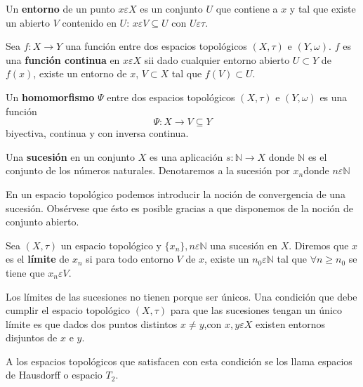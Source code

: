 \begin{definicion}
Un {\bf entorno} de un punto $x \varepsilon X$ es un conjunto $U$ que contiene a $x$ y tal que existe un abierto $V$ contenido en $U$: $x \varepsilon V \subseteq U$ con $U \varepsilon \tau$.
\end{definicion}

\begin{definicion}
Sea $f: X \rightarrow Y$ una funci\'on entre dos espacios topol\'ogicos $(X, \tau)$ e $(Y,\omega)$. $f$ es una {\bf funci\'on continua} en $x \varepsilon X$ sii dado cualquier entorno abierto $U \subset Y$ de $f(x)$, existe un entorno de $x$, $V \subset X$ tal que $f(V) \subset U$.
\end{definicion}

\begin{definicion}
Un {\bf homomorfismo} $\Psi$ entre dos espacios topol\'ogicos $(X,\tau)$ e $(Y,\omega)$ es una funci\'on
\[
\Psi: X \rightarrow V \subseteq Y
\]
biyectiva, continua y con inversa continua.
\end{definicion}

\begin{definicion}
Una {\bf sucesi\'on} en un conjunto $X$ es una aplicaci\'on $s: \mathbb{N} \rightarrow X$ donde $\mathbb{N}$ es el conjunto de los n\'umeros naturales. Denotaremos a la sucesi\'on por ${x_n} \text{donde  } n \varepsilon \mathbb{N}$
\end{definicion}

En un espacio topol\'ogico podemos introducir la noci\'on de convergencia de una sucesi\'on. Obs\'ervese que \'esto es posible gracias a que disponemos de la noci\'on de conjunto abierto.

\begin{definicion}
Sea $(X, \tau)$ un espacio topol\'ogico y $\{x_n\}, n \varepsilon \mathbb{N}$ una sucesi\'on en $X$. Diremos que $x$ es el {\bf l\'imite} de $x_n $ si para todo entorno $V$ de $x$, existe un $n_0 \varepsilon \mathbb{N}$ tal que $\forall n \geq n_0$ se tiene que $x_n \varepsilon V$.
\end{definicion}

Los l\'imites de las sucesiones no tienen porque ser \'unicos. Una condici\'on que debe cumplir el espacio topol\'ogico $(X,\tau)$ para que las sucesiones tengan un \'unico l\'imite es que dados dos puntos distintos $x \neq y$,con $ x,y \varepsilon X$ existen entornos disjuntos de $x$ e $y$.

A los espacios topol\'ogicos que satisfacen con esta condici\'on se los llama espacios de Hausdorff o espacio $T_2$.


